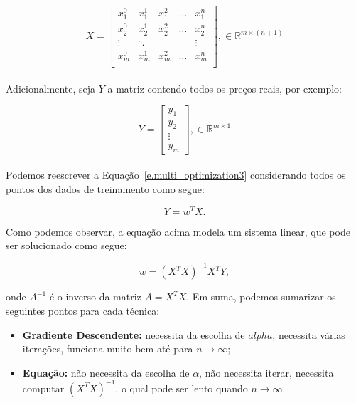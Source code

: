 \[X=
  \begin{bmatrix}
    x_1^0 & x_1^1 & x_1^2 & \dots & x_1^n \\
    x_2^0 & x_2^1 & x_2^2 & \dots & x_2^n \\
    \vdots & \ddots & & & \vdots \\
    x_m^0 & x_m^1 & x_m^2 & \dots & x_m^n \\
  \end{bmatrix}, \in \mathbb{R}^{m\times (n+1)}\] \\

Adicionalmente, seja $Y$ a matriz contendo todos os preços reais, por exemplo: 

\[Y=
  \begin{bmatrix}
    y_1 \\
    y_2 \\
    \vdots \\
    y_m
  \end{bmatrix}, \in \mathbb{R}^{m\times1}\] \\
  
Podemos reescrever a Equação~\ref{e.multi_optimization3} considerando todos os pontos dos dados de treinamento como segue:
  
\begin{equation}
\label{e.linear_system}
Y = w^TX.	
\end{equation}

Como podemos observar, a equação acima modela um sistema linear, que pode ser solucionado como segue:

\begin{equation}
\label{e.solution_linear_system}
w = (X^TX)^{-1}X^TY,
\end{equation}

onde $A^{-1}$ é o inverso da matriz $A = X^TX$. Em suma, podemos sumarizar os seguintes pontos para cada técnica:

\begin{itemize}
\item \textbf{Gradiente Descendente:} necessita da escolha de $alpha$, necessita várias iterações, funciona muito bem até para $n \rightarrow \infty$;
\item \textbf{Equação:} não necessita da escolha de $\alpha$, não necessita iterar, necessita computar $(X^TX)^{-1}$, o qual pode ser lento quando $n \rightarrow \infty$.
\end{itemize} 